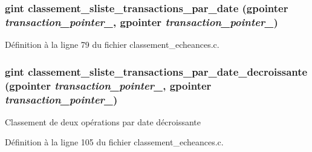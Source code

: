 \subsubsection[{classement\_\-sliste\_\-transactions\_\-par\_\-date}]{\setlength{\rightskip}{0pt plus 5cm}gint classement\_\-sliste\_\-transactions\_\-par\_\-date (gpointer {\em transaction\_\-pointer\_}, \/  gpointer {\em transaction\_\-pointer\_})}\label{classement__echeances_8h_a232a7c3b304a4f2fa38967d8e761d827}


Définition à la ligne 79 du fichier classement\_\-echeances.c.

\subsubsection[{classement\_\-sliste\_\-transactions\_\-par\_\-date\_\-decroissante}]{\setlength{\rightskip}{0pt plus 5cm}gint classement\_\-sliste\_\-transactions\_\-par\_\-date\_\-decroissante (gpointer {\em transaction\_\-pointer\_}, \/  gpointer {\em transaction\_\-pointer\_})}\label{classement__echeances_8h_a31706ce946b77cec0e449468cd49b194}
Classement de deux opérations par date décroissante 

Définition à la ligne 105 du fichier classement\_\-echeances.c.

